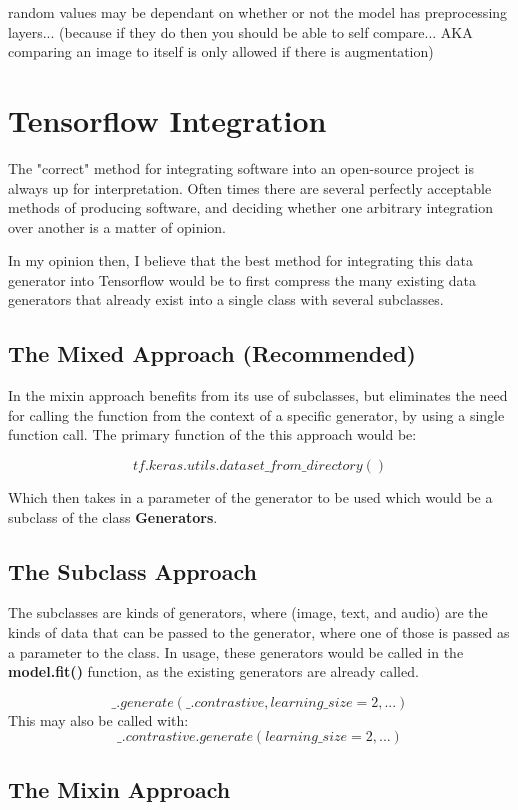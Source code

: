 \documentclass[
	letterpaper, %
	10pt, %
	unnumberedsections, %
	twoside, %
]{LTJournalArticle}
\begin{document}
random values may be dependant on whether or not the model has preprocessing layers... (because if they do then you should be able to self compare... AKA comparing an image to itself is only allowed if there is augmentation)



\section{Tensorflow Integration}
The "correct" method for integrating software into an open-source project is always up for interpretation. Often times there are several perfectly acceptable methods of producing software, and deciding whether one arbitrary integration over another is a matter of opinion.

In my opinion then, I believe that the best method for integrating this data generator into Tensorflow would be to first compress the many existing data generators that already exist into a single class with several subclasses.

\subsection{The Mixed Approach (Recommended)}
In the mixin approach benefits from its use of subclasses, but eliminates the need for calling the function from the context of a specific generator, by using a single function call.
The primary function of the this approach would be:

\[ tf.keras.utils.dataset\_from\_directory() \]

Which then takes in a parameter of the generator to be used which would be a subclass of the class \textbf{Generators}.

\subsection{The Subclass Approach}
The subclasses are kinds of generators, where (image, text, and audio) are the kinds of data that can be passed to the generator, where one of those is passed as a parameter to the class. In usage, these generators would be called in the \textbf{model.fit()} function, as the existing generators are already called.

\[ \_.generate(\_.contrastive, learning\_size=2, ...) \]
This may also be called with:
\[ \_.contrastive.generate(learning\_size=2, ...) \]

\subsection{The Mixin Approach}
\end{document}
